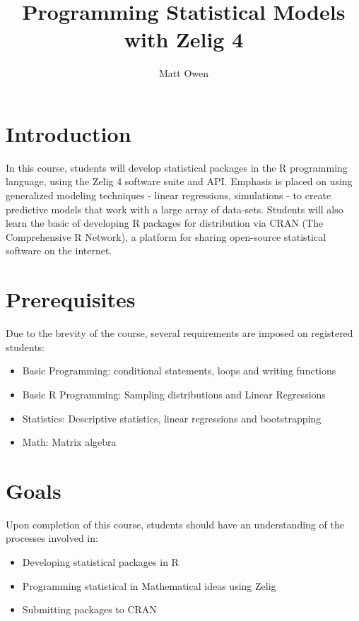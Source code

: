 \documentclass{article}
\title{Programming Statistical Models with Zelig 4}
\author{Matt Owen}
\begin{document}
\maketitle


%
\section{Introduction}
\label{intro}

In this course, students will develop statistical packages in the R programming 
language, using the Zelig 4 software suite and API. Emphasis is placed on using 
generalized modeling techniques - linear regressions, simulations - to create 
predictive models that work with a large array of data-sets. Students will also 
learn the basic of developing R packages for distribution via CRAN 
(The Comprehensive R Network), a platform for sharing open-source statistical 
software on the internet.


%
\section{Prerequisites}
\label{prereq}

Due to the brevity of the course, several requirements are imposed on registered
students:

\begin{itemize}
  \item Basic Programming: conditional statements, loops and writing functions
  \item Basic R Programming: Sampling distributions and Linear Regressions
  \item Statistics: Descriptive statistics, linear regressions and bootstrapping
  \item Math: Matrix algebra
\end{itemize}


%
\section{Goals}
\label{goals}

Upon completion of this course, students should have an understanding of the processes
involved in:

\begin{itemize}
	\item Developing statistical packages in R
	\item Programming statistical in Mathematical ideas using Zelig
	\item Submitting packages to CRAN
\end{itemize}
\end{document}
